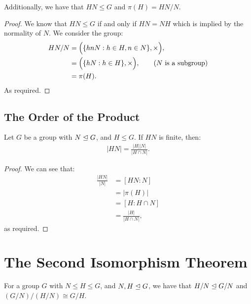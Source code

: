\newpage
\noindent
Additionally, we have that $HN \leq G$ and $\pi(H) = HN/N$.
\begin{proof}
    We know that $HN \leq G$ if and only if $HN = NH$
    which is implied by the normality of $N$.
    We consider the group: \begin{align*}
        HN / N &=\Bigl(\{hnN : h \in H, n \in N\}, \times \Bigr), \\
        &=\Bigl(\{hN : h \in H\}, \times \Bigr), \tag{$N$ is a subgroup} \\
        &= \pi(H).
    \end{align*} As required.
\end{proof} 

\subsection{The Order of the Product}

Let $G$ be a group with $N \trianglelefteq G$, and $H \leq G$.
If $HN$ is finite, then: \begin{align*}
    |HN| = \frac{|H||N|}{|H \cap N|}.
\end{align*}

\begin{proof}
    We can see that: \begin{align*}
        \frac{|HN|}{|N|} 
        &= [HN : N] \tag{By Lagrange's Theorem} \\
        &= |\pi(H)| \tag{By the above} \\
        &= [H : H \cap N] \tag{By the First Isomorphism Theorem} \\
        &= \frac{|H|}{|H \cap N|}, \tag{By Lagrange's Theorem}
    \end{align*} as required.
\end{proof}

\newpage

\section{The Second Isomorphism Theorem}

For a group $G$ with $N \leq H \leq G$, and $N, H \trianglelefteq G$, we have
that $H/N \trianglelefteq G/N$ and $(G / N)/(H / N) \cong G/H$.

